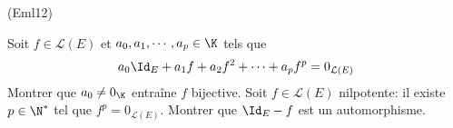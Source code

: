 \begin{tiny}(Eml12)\end{tiny} Soit $f\in\mathcal{L}(E)$ et $a_0,a_1,\cdots, a_p\in \K$ tels que
\begin{displaymath}
 a_0 \Id_E + a_1f + a_2f^2+ \cdots + a_p f^p = 0_{\mathcal{L}(E)}
\end{displaymath}
Montrer que $a_0\neq 0_\K$ entraîne $f$ bijective.\newline
Soit $f\in \mathcal{L}(E)$ nilpotente: il existe $p\in \N^*$ tel que $f^p = 0_{\mathcal{L}(E)}$. Montrer que $\Id_E -f$ est un automorphisme.